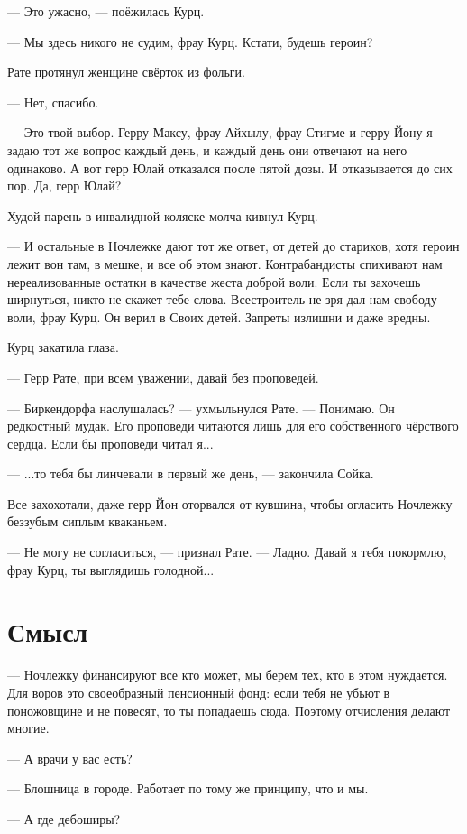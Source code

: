 --- Это ужасно, --- поёжилась Курц.

--- Мы здесь никого не судим, фрау Курц.
Кстати, будешь героин?

Рате протянул женщине свёрток из фольги.

--- Нет, спасибо.

--- Это твой выбор.
Герру Максу, фрау Айхылу, фрау Стигме и герру Йону я задаю тот же вопрос каждый день, и каждый день они отвечают на него одинаково.
А вот герр Юлай отказался после пятой дозы.
И отказывается до сих пор.
Да, герр Юлай?

Худой парень в инвалидной коляске молча кивнул Курц.

--- И остальные в Ночлежке дают тот же ответ, от детей до стариков, хотя героин лежит вон там, в мешке, и все об этом знают.
Контрабандисты спихивают нам нереализованные остатки в качестве жеста доброй воли.
Если ты захочешь ширнуться, никто не скажет тебе слова.
Всестроитель не зря дал нам свободу воли, фрау Курц.
Он верил в Своих детей.
Запреты излишни и даже вредны.

Курц закатила глаза.

--- Герр Рате, при всем уважении, давай без проповедей.

--- Биркендорфа наслушалась? --- ухмыльнулся Рате.
--- Понимаю.
Он редкостный мудак.
Его проповеди читаются лишь для его собственного чёрствого сердца.
Если бы проповеди читал я...

--- ...то тебя бы линчевали в первый же день, --- закончила Сойка.

Все захохотали, даже герр Йон оторвался от кувшина, чтобы огласить Ночлежку беззубым сиплым кваканьем.

--- Не могу не согласиться, --- признал Рате.
--- Ладно.
Давай я тебя покормлю, фрау Курц, ты выглядишь голодной...

\section{Смысл}

--- Ночлежку финансируют все кто может, мы берем тех, кто в этом нуждается.
Для воров это своеобразный пенсионный фонд: если тебя не убьют в поножовщине и не повесят, то ты попадаешь сюда.
Поэтому отчисления делают многие.

--- А врачи у вас есть?

--- Блошница в городе.
Работает по тому же принципу, что и мы.

--- А где дебоширы?

